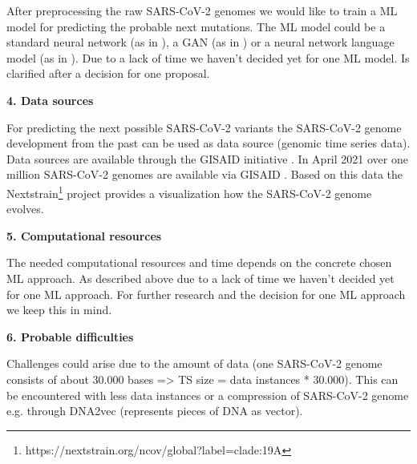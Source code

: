 After preprocessing the raw SARS-CoV-2 genomes we would like to train a \ac{ML} model for predicting the probable next mutations. The \ac{ML} model could be a standard neural network (as in  \cite{Salama2016}), a GAN (as in \cite{Berman2020}) or a neural network language model (as in \cite{Hie2021}). Due to a lack of time we haven't decided yet for one \ac{ML} model.
\color{green}
Is clarified after a decision for one proposal.
\color{black}

\textbf{4. Data sources}

For predicting the next possible SARS-CoV-2 variants the SARS-CoV-2 genome develop\-ment from the past can be used as data source (genomic time series data). Data sources are available through the GISAID initiative \cite{Gisaid2021}. In April 2021 over one million SARS-CoV-2 genomes are available via GISAID \cite{Maxmen2021}. Based on this data the Nextstrain\footnote{https://nextstrain.org/ncov/global?label=clade:19A} project provides a visualization how the SARS-CoV-2 genome evolves.


\textbf{5. Computational resources}

The needed computational resources and time depends on the concrete chosen \ac{ML} approach. As described above due to a lack of time we haven't decided yet for one \ac{ML} approach. For further research and the decision for one \ac{ML} approach we keep this in mind.

\textbf{6. Probable difficulties}

Challenges could arise due to the amount of data (one SARS-CoV-2 genome consists of about 30.000 bases => TS size = data instances * 30.000). This can be encountered with less data instances or a compression of SARS-CoV-2 genome e.g. through DNA2vec \cite{Ng2017} (represents pieces of \ac{DNA} as vector).

\newpage
